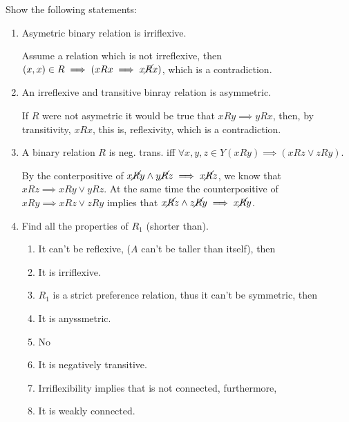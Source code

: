 \documentclass{article}
\def\noR{\cancel{R}}
\begin{document}
 Show the following statements:
\begin{enumerate}
\item Asymetric binary relation is irriflexive.

 Assume a relation which is not irreflexive, then $(x,x)\in
R \implies (xRx\implies x\noR x)$, which is a contradiction.

\item An irreflexive and transitive binray relation is asymmetric.

 If $R$ were not asymetric it would be true that $xRy\implies yRx$, then, by
transitivity, $xRx$, this is, reflexivity, which is a contradiction.

\item A binary relation $R$ is neg. trans. iff $\forall x,y,z\in Y (xRy)\implies
(xRz \vee zRy)$.

 By the conterpositive of $x\noR y \wedge y\noR z\implies x\noR z$, we know that
$xRz\implies xRy \vee yRz$. At the same time the counterpositive of $xRy\implies
xRz \vee zRy$ implies that $x\noR z \wedge z\noR y \implies x\noR y$.

\item Find all the properties of $R_1$ (shorter than).

\begin{enumerate}
\item It can't be reflexive, ($A$ can't be taller than itself), then
\item It is irriflexive.
\item $R_1$ is a strict preference relation, thus it can't be symmetric, then
\item It is anyssmetric.
\item No
\item It is negatively transitive.
\item Irriflexibility implies that is not connected, furthermore,
\item It is weakly connected.
\end{enumerate}
\end{enumerate}
\end{document}
